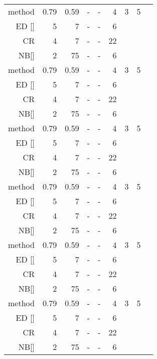 \documentclass[twocolumn]{article}
\begin{document}
\begin {table*}[tp]
\begin{tabular*}{\textwidth}{@{\hskip 6pt\extracolsep{\stretch{1}}}*{9}{r}}
method  & 0.79  & 0.59  & - & - & 4  & 3  & 5  &    \\
ED  []  & 5     & 7     & - & - & 6  &    &    &    \\
CR      & 4     & 7     & - & - & 22 &    &    &    \\
NB[]    & 2     & 75    & - & - & 6  &    &    &    \\
method  & 0.79  & 0.59  & - & - & 4  & 3  & 5  &    \\
ED  []  & 5     & 7     & - & - & 6  &    &    &    \\
CR      & 4     & 7     & - & - & 22 &    &    &    \\
NB[]    & 2     & 75    & - & - & 6  &    &    &    \\
method  & 0.79  & 0.59  & - & - & 4  & 3  & 5  &    \\
ED  []  & 5     & 7     & - & - & 6  &    &    &    \\
CR      & 4     & 7     & - & - & 22 &    &    &    \\
NB[]    & 2     & 75    & - & - & 6  &    &    &    \\
method  & 0.79  & 0.59  & - & - & 4  & 3  & 5  &    \\
ED  []  & 5     & 7     & - & - & 6  &    &    &    \\
CR      & 4     & 7     & - & - & 22 &    &    &    \\
NB[]    & 2     & 75    & - & - & 6  &    &    &    \\
method  & 0.79  & 0.59  & - & - & 4  & 3  & 5  &    \\
ED  []  & 5     & 7     & - & - & 6  &    &    &    \\
CR      & 4     & 7     & - & - & 22 &    &    &    \\
NB[]    & 2     & 75    & - & - & 6  &    &    &    \\
method  & 0.79  & 0.59  & - & - & 4  & 3  & 5  &    \\
ED  []  & 5     & 7     & - & - & 6  &    &    &    \\
CR      & 4     & 7     & - & - & 22 &    &    &    \\
NB[]    & 2     & 75    & - & - & 6  &    &    & 
\end{tabular*}
\end{table*}
\end{document}

